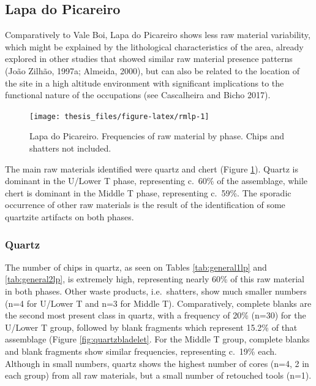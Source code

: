 \documentclass[12pt,twoside]{reedthesis}
\begin{document}
\hypertarget{lapa-do-picareiro-3}{%
\subsection{Lapa do Picareiro}\label{lapa-do-picareiro-3}}

Comparatively to Vale Boi, Lapa do Picareiro shows less raw material variability, which might be explained by the lithological characteristics of the area, already explored in other studies that showed similar raw material presence patterns (João Zilhão, 1997a; Almeida, 2000), but can also be related to the location of the site in a high altitude environment with significant implications to the functional nature of the occupations (see Cascalheira and Bicho 2017).
\begin{figure}[H]

{\centering \texttt{[image: thesis\_files/figure-latex/rmlp-1]} 

}

\caption{Lapa do Picareiro. Frequencies of raw material by phase. Chips and shatters not included.}\label{fig:rmlp}
\end{figure}
The main raw materials identified were quartz and chert (Figure \ref{fig:rmlp}). Quartz is dominant in the U/Lower T phase, representing c.~60\% of the assemblage, while chert is dominant in the Middle T phase, representing c.~59\%. The sporadic occurrence of other raw materials is the result of the identification of some quartzite artifacts on both phases.

\hypertarget{quartz-1}{%
\subsubsection{Quartz}\label{quartz-1}}

The number of chips in quartz, as seen on Tables \ref{tab:general1lp} and \ref{tab:general2lp}, is extremely high, representing nearly 60\% of this raw material in both phases. Other waste products, i.e.~shatters, show much smaller numbers (n=4 for U/Lower T and n=3 for Middle T). Comparatively, complete blanks are the second most present class in quartz, with a frequency of 20\% (n=30) for the U/Lower T group, followed by blank fragments which represent 15.2\% of that assemblage (Figure \ref{fig:quartzbladelet}. For the Middle T group, complete blanks and blank fragments show similar frequencies, representing c.~19\% each. Although in small numbers, quartz shows the highest number of cores (n=4, 2 in each group) from all raw materials, but a small number of retouched tools (n=1).
\end{document}
